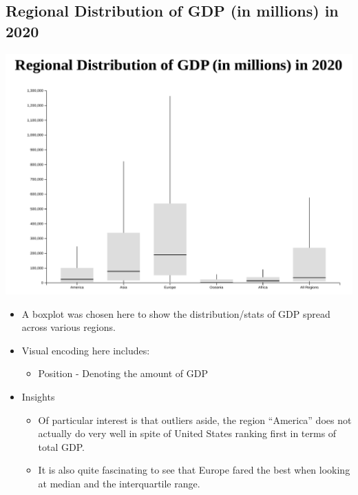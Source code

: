 \documentclass[a4paper, 11pt]{article}
\begin{document}
\subsection{Regional Distribution of GDP (in millions) in 2020}
\label{sec:org729e4b3}
\begin{center}
\includegraphics[width=.9\linewidth]{./charts/gdp_boxplot.png}
\end{center}
\begin{itemize}
\item A boxplot was chosen here to show the distribution/stats of GDP spread across various regions.
\item Visual encoding here includes:
\begin{itemize}
\item Position - Denoting the amount of GDP
\end{itemize}
\item Insights
\begin{itemize}
\item Of particular interest is that outliers aside, the region ``America'' does not actually do very well in spite of United States ranking first in terms of total GDP.
\item It is also quite fascinating to see that Europe fared the best when looking at median and the interquartile range.
\end{itemize}
\end{itemize}
\end{document}
